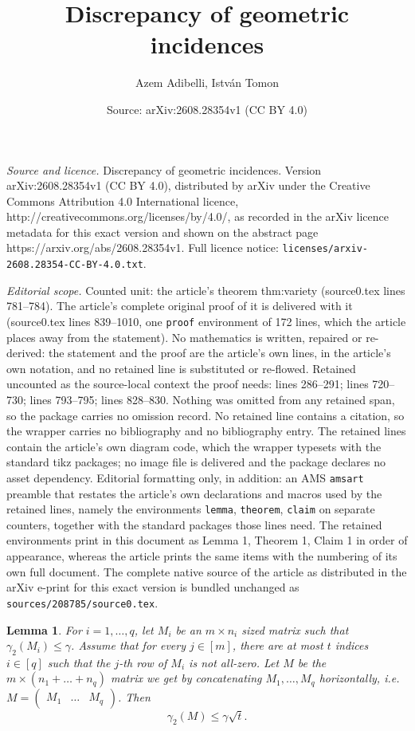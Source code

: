 \documentclass[10pt,a4paper]{amsart}
\title{Discrepancy of geometric incidences}
\author{Azem Adibelli, Istv\'an Tomon}
\date{Source: arXiv:2608.28354v1 (CC BY 4.0)}
\newtheorem{lemma}{Lemma}
\begin{document}
\maketitle

\noindent\emph{Source and licence.} Discrepancy of geometric incidences. Version arXiv:2608.28354v1 (CC BY 4.0), distributed by arXiv under the Creative Commons Attribution 4.0 International licence, http://creativecommons.org/licenses/by/4.0/, as recorded in the arXiv licence metadata for this exact version and shown on the abstract page https://arxiv.org/abs/2608.28354v1. Full licence notice: \texttt{licenses/arxiv-2608.28354-CC-BY-4.0.txt}.\par\smallskip

\noindent\textit{Editorial scope.} Counted unit: the article's theorem thm:variety (source0.tex lines 781--784). The article's complete original proof of it is delivered with it (source0.tex lines 839--1010, one \texttt{proof} environment of 172 lines, which the article places away from the statement). No mathematics is written, repaired or re-derived: the statement and the proof are the article's own lines, in the article's own notation, and no retained line is substituted or re-flowed.  Retained uncounted as the source-local context the proof needs: lines 286--291; lines 720--730; lines 793--795; lines 828--830.  Nothing was omitted from any retained span, so the package carries no omission record.  No retained line contains a citation, so the wrapper carries no bibliography and no bibliography entry.  The retained lines contain the article's own diagram code, which the wrapper typesets with the standard tikz packages; no image file is delivered and the package declares no asset dependency.  Editorial formatting only, in addition: an AMS \texttt{amsart} preamble that restates the article's own declarations and macros used by the retained lines, namely the environments \texttt{lemma}, \texttt{theorem}, \texttt{claim} on separate counters, together with the standard packages those lines need.  The retained environments print in this document as Lemma 1, Theorem 1, Claim 1 in order of appearance, whereas the article prints the same items with the numbering of its own full document.  The complete native source of the article as distributed in the arXiv e-print for this exact version is bundled unchanged as \texttt{sources/208785/source0.tex}.
	\begin{lemma}\label{lemma:concatenation}
		For $i=1,\dots,q$, let $M_i$ be an $m\times n_i$ sized matrix such that $\gamma_2(M_i)\leq \gamma$.  Assume that for every $j\in [m]$, there are at most $t$ indices $i\in [q]$ such that the $j$-th row of $M_i$ is not all-zero. Let $M$ be the $m\times (n_1+\dots+n_q)$ matrix we get by concatenating $M_1,\dots,M_q$ horizontally, i.e. $M=\begin{pmatrix}
			M_1 & \dots & M_q
		\end{pmatrix}$. Then
		$$\gamma_2(M)\leq \gamma\sqrt{t}.$$
	\end{lemma}
\end{document}
